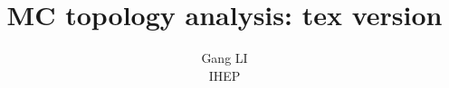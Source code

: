 \documentclass[11pt]{article}
\begin{document}
\title{MC topology analysis: tex version}
\author{Gang LI\\
\small{ IHEP}}
\maketitle
\end{document}
